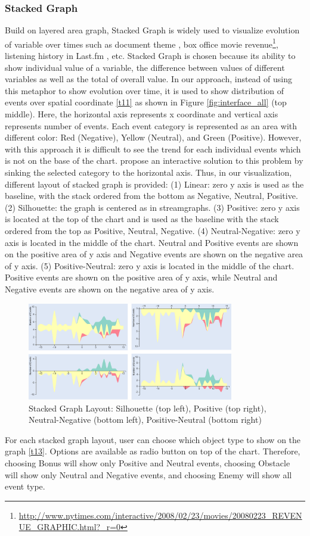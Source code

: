 \documentclass{vgtc}                          %
\begin{document}
\subsubsection{Stacked Graph}
Build on layered area graph, Stacked Graph is widely used to visualize evolution of variable over times such as document theme \cite{havre}, box office movie revenue\footnote{\url{http://www.nytimes.com/interactive/2008/02/23/movies/20080223_REVENUE_GRAPHIC.html?_r=0}}, listening history in Last.fm \cite{byron}, etc. Stacked Graph is chosen because its ability to show individual value of a variable, the difference between values of different variables as well as the total of overall value. In our approach, instead of using this metaphor to show evolution over time, it is used to show distribution of events over spatial coordinate \ref{t11} as shown in Figure \ref{fig:interface_all} (top middle). Here, the horizontal axis represents x coordinate and vertical axis represents number of events. Each event category is represented as an area with different color: Red (Negative), Yellow (Neutral), and Green (Positive). However, with this approach it is difficult to see the trend for each individual events which is not on the base of the chart. \cite{alan} propose an interactive solution to this problem by sinking the selected category to the horizontal axis. Thus, in our visualization, different layout of stacked graph is provided: (1) Linear: zero y axis is used as the baseline, with the stack ordered from the bottom as Negative, Neutral, Positive. (2) Silhouette: the graph is centered as in streamgraphs. (3) Positive: zero y axis is located at the top of the chart and is used as the baseline with the stack ordered from the top as Positive, Neutral, Negative. (4) Neutral-Negative: zero y axis is located in the middle of the chart. Neutral and Positive events are shown on the positive area of y axis and Negative events are shown on the negative area of y axis. (5) Positive-Neutral: zero y axis is located in the middle of the chart. Positive events are shown on the positive area of y axis, while Neutral and Negative events are shown on the negative area of y axis.
\begin{figure}
	\centering
	\includegraphics[width=90mm]{images/layout.png}
	\caption{Stacked Graph Layout: Silhouette (top left), Positive (top right), Neutral-Negative (bottom left), Positive-Neutral (bottom right)}
	\label{fig:layout}
\end{figure}
For each stacked graph layout, user can choose which object type to show on the graph \ref{t13}. Options are available as radio button on top of the chart. Therefore, choosing Bonus will show only Positive and Neutral events, choosing Obstacle will show only Neutral and Negative events, and choosing Enemy will show all event type.
\end{document}
